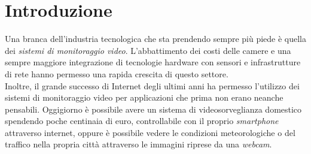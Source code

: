\chapter{Introduzione}
\label{Introduzione}
\thispagestyle{empty}

Una branca dell'industria tecnologica che sta prendendo sempre pi\`u piede \`e quella dei \textit{sistemi di monitoraggio video}.
L'abbattimento dei costi delle camere e una sempre maggiore integrazione di tecnologie hardware con sensori e infrastrutture di rete hanno permesso una rapida crescita di questo settore.\\
Inoltre, il grande successo di Internet degli ultimi anni ha permesso l'utilizzo dei sistemi di monitoraggio video per applicazioni che prima non erano neanche pensabili.
Oggigiorno \`e possibile avere un sistema di videosorveglianza domestico spendendo poche centinaia di euro, controllabile con il proprio \textit{smartphone} attraverso internet, oppure \`e possibile vedere le condizioni meteorologiche o del traffico nella propria citt\`a attraverso le immagini riprese da una \textit{webcam}.
